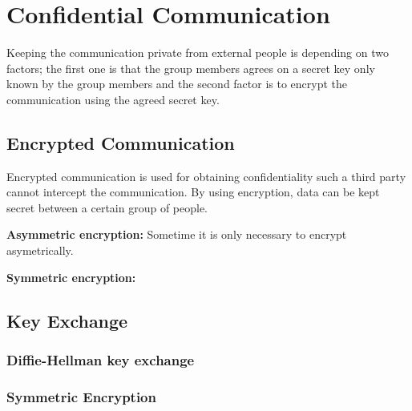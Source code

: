 \section{Confidential Communication}
Keeping the communication private from external people is depending on two factors; the first one is that the group members agrees on a secret key only known by the group members and the second factor is to encrypt the communication using the agreed secret key.
 
\subsection{Encrypted Communication}
Encrypted communication is used for obtaining confidentiality such a third party cannot intercept the communication. By using encryption, data can be kept secret between a certain group of people.

\textbf{Asymmetric encryption:} Sometime it is only necessary to encrypt asymetrically.

\textbf{Symmetric encryption:} 

\subsection{Key Exchange}
\subsubsection{Diffie-Hellman key exchange}
\subsubsection{Symmetric Encryption}





